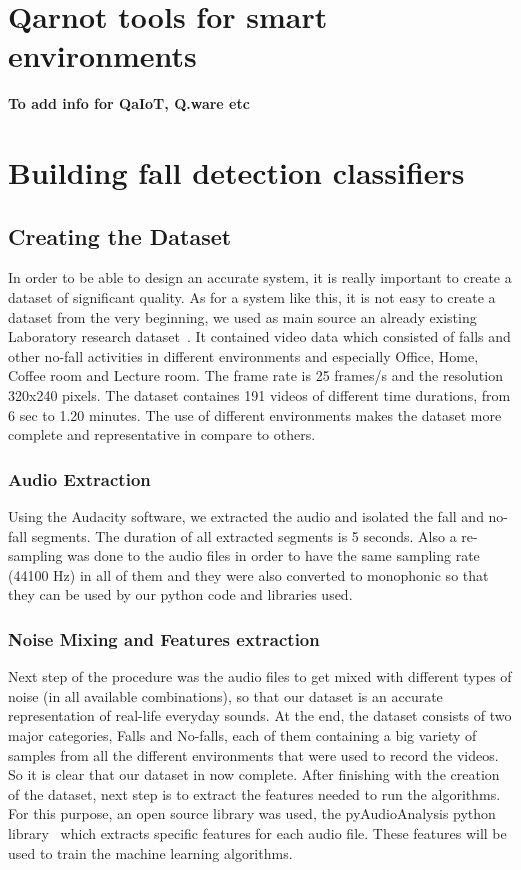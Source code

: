 \documentclass[10pt, conference, compsocconf]{IEEEtran}
\begin{document}
\section{Qarnot tools for smart environments} \label{Smart}

{\bf To add info for QaIoT, Q.ware etc}


\section{Building fall detection classifiers} \label{Fall}

\subsection{Creating the Dataset} 
 
In order to be able to design an accurate system, it is really important to create a dataset of significant quality. As for a system like this, it is not easy to create a dataset from the very beginning, we used as main source an already existing Laboratory research dataset~\cite{Dataset}. It contained video data which consisted of falls and other no-fall activities in different environments and especially Office, Home, Coffee room and Lecture room. The frame rate is 25 frames/s and the resolution 320x240 pixels. The dataset containes 191 videos of different time durations, from 6 sec to 1.20 minutes. The use of different environments makes the dataset more complete and representative in compare to others.  

\subsubsection{Audio Extraction}

Using the Audacity software, we extracted the audio and isolated the fall and no-fall segments. The duration of all extracted segments is 5 seconds. Also a re-sampling was done to the audio files in order to have the same sampling rate (44100 Hz) in all of them and they were also converted to monophonic so that they can be used by our python code and libraries used.

\subsubsection{Noise Mixing and Features extraction}

Next step of the procedure was the audio files to get mixed with different types of noise (in all available combinations), so that our dataset is an accurate representation of real-life everyday sounds. At the end, the dataset consists of two major categories, Falls and No-falls, each of them containing a big variety of samples from all the different environments that were used to record the videos. So it is clear that our dataset in now complete. After finishing with the creation of the dataset, next step is to extract the features needed to run the algorithms. For this purpose, an open source library was used, the pyAudioAnalysis python library~\cite{giannakopoulos2015pyaudioanalysis} which extracts specific features for each audio file. These features will be used to train the machine learning algorithms.
\end{document}
